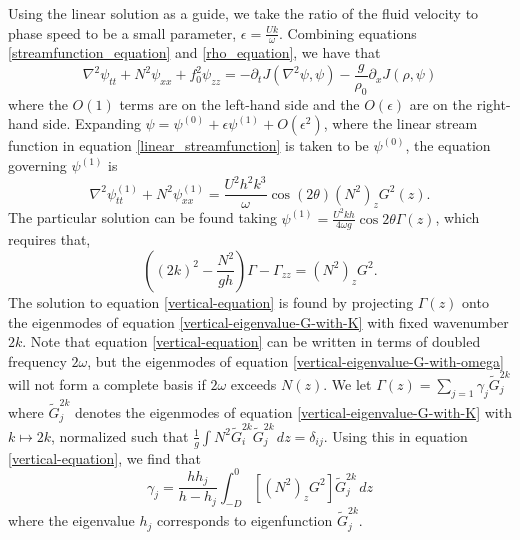 \documentclass{jfm}
\begin{document}
Using the linear solution as a guide, we take the ratio of the fluid velocity to phase speed to be a small parameter, $\epsilon = \frac{U k}{\omega}$. Combining equations \ref{streamfunction_equation} and \ref{rho_equation}, we have that
\begin{equation}
\nabla^2 \psi_{tt} + N^2 \psi_{xx} + f_0^2 \psi_{zz} = - \partial_t J\left(\nabla^2 \psi, \psi \right) - \frac{g}{\rho_0} \partial_x J\left(\rho, \psi \right)
\end{equation}
where the $O(1)$ terms are on the left-hand side and the $O(\epsilon)$ are on the right-hand side. Expanding $\psi = \psi^{(0)} + \epsilon \psi^{(1)} + O(\epsilon^2)$, where the linear stream function in equation \ref{linear_streamfunction} is taken to be $\psi^{(0)}$, the equation governing $\psi^{(1)}$ is
\begin{equation}
\nabla^2 \psi^{(1)}_{tt} + N^2 \psi^{(1)}_{xx} = \frac{U^2 h^2 k^3}{\omega} \cos (2 \theta) (N^2)_z G^2(z).
\end{equation}
The particular solution can be found taking $\psi^{(1)}=\frac{U^2 kh}{4\omega g}\cos 2\theta \Gamma(z)$, which requires that,
\begin{equation}
\label{vertical-equation}
\left((2k)^2-\frac{N^2}{gh}\right) \Gamma - \Gamma_{zz} = (N^2)_z G^2.
\end{equation}
The solution to equation \ref{vertical-equation} is found by projecting $\Gamma(z)$ onto the eigenmodes of equation \ref{vertical-eigenvalue-G-with-K} with fixed wavenumber $2k$. Note that equation \ref{vertical-equation} can be written in terms of doubled frequency $2 \omega$, but the eigenmodes of equation \ref{vertical-eigenvalue-G-with-omega} will not form a complete basis if $2\omega$ exceeds $N(z)$. We let $\Gamma(z) = \sum_{j=1} \gamma_j \tilde{G}^{2k}_j$ where $\tilde{G}^{2k}_j$ denotes the eigenmodes of equation \ref{vertical-eigenvalue-G-with-K} with $k \mapsto 2k$, normalized such that $\frac{1}{g}\int N^2 \tilde{G}^{2k}_i \tilde{G}^{2k}_j \, dz= \delta_{ij}$. Using this in equation \ref{vertical-equation}, we find that
\begin{equation}
\gamma_j = \frac{h h_j}{h-h_j}\int_{-D}^0 \left[ (N^2)_z G^2 \right] \tilde{G}^{2k}_j\, dz
\end{equation}
where the eigenvalue $h_j$ corresponds to eigenfunction $\tilde{G}^{2k}_j$.



\end{document}
